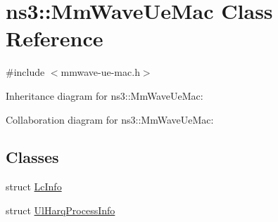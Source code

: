 \hypertarget{classns3_1_1MmWaveUeMac}{}\section{ns3\+:\+:Mm\+Wave\+Ue\+Mac Class Reference}
\label{classns3_1_1MmWaveUeMac}


{\ttfamily \#include $<$mmwave-\/ue-\/mac.\+h$>$}



Inheritance diagram for ns3\+:\+:Mm\+Wave\+Ue\+Mac\+:


Collaboration diagram for ns3\+:\+:Mm\+Wave\+Ue\+Mac\+:
\subsection*{Classes}
\begin{DoxyCompactItemize}
\item 
struct \hyperlink{structns3_1_1MmWaveUeMac_1_1LcInfo}{Lc\+Info}
\item 
struct \hyperlink{structns3_1_1MmWaveUeMac_1_1UlHarqProcessInfo}{Ul\+Harq\+Process\+Info}
\end{DoxyCompactItemize}
